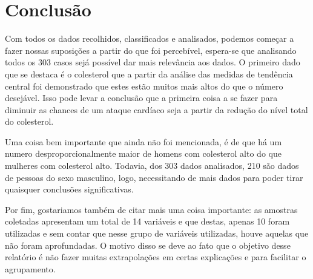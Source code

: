 
\chapter*[Conclusão]{Conclusão}

    Com todos os dados recolhidos, classificados e analisados, podemos começar a fazer nossas suposições 
    a partir do que foi percebível, espera-se que analisando todos os 303 casos sejá possível dar mais relevância aos dados.
    O primeiro dado que se destaca é o colesterol que a partir da análise 
    das medidas de tendência central foi demonstrado que estes estão muitos mais altos do que o número desejável.
    Isso pode levar a conclusão que a primeira coisa a se fazer para diminuir as chances de um ataque cardíaco seja 
    a partir da redução do nível total do colesterol.

    Uma coisa bem importante que ainda não foi mencionada, é de que há um numero desproporcionalmente maior 
    de homens com colesterol alto do que mulheres com colesterol alto. Todavia, dos 303 dados analisados, 210 são
    dados de pessoas do sexo masculino, logo, necessitando de mais dados para poder tirar quaisquer conclusões significativas.

    Por fim, gostariamos também de citar mais uma coisa importante: as amostras coletadas apresentam um total 
    de 14 variáveis e que destas, apenas 10 foram utilizadas e sem contar que nesse grupo de variáveis utilizadas, houve
    aquelas que não foram aprofundadas. O motivo disso se deve ao fato que o objetivo desse relatório é 
    não fazer muitas extrapolações em certas explicações e para facilitar o agrupamento.
